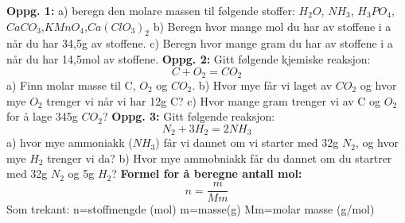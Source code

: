\documentclass[12pt,a4paper]{article}
\begin{document}
\begin{center}
\end{center}\vspace{1cm}
\textbf{Oppg. 1:}\nl
a) beregn den molare massen til følgende stoffer:\nl
$H_2O$, $NH_3$, $H_3PO_4$,$CaCO_3$,$KMnO_4$,$Ca(ClO_3)_2$\nl
b) Beregn hvor mange mol du har av stoffene i a når du har 34,5g av stoffene.\nl
c) Beregn hvor mange gram du har av stoffene i a når du har 14,5mol av stoffene.\nl
\textbf{Oppg. 2:}\nl
Gitt følgende kjemiske reaksjon:\nl
$$C+O_2=CO_2$$\nl
a) Finn molar masse til C, $O_2$ og $CO_2$.\nl
b) Hvor mye får vi laget av $CO_2$ og hvor mye $O_2$ trenger vi når vi har 12g C?\nl
c) Hvor mange gram trenger vi av C og $O_2$ for å lage 345g $CO_2$?\nl
\newpage
\textbf{Oppg. 3:}\nl
Gitt følgende reaksjon:
$$N_2+3H_2=2NH_3$$
a) hvor mye ammoniakk ($NH_3$) får vi dannet om vi starter med 32g $N_2$, og hvor mye $H_2$ trenger vi da?\nl
b) Hvor mye ammobniakk får du dannet om du startrer med 32g $N_2$ og 5g $H_2$?
\nl[5]
\textbf{Formel for å beregne antall mol:}\nl[2]
$$n=\frac{m}{Mm}$$
Som trekant:\nl
{}
n=stoffmengde (mol)\nl
m=masse(g)\nl
Mm=molar masse (g/mol)\nl
\end{document}
